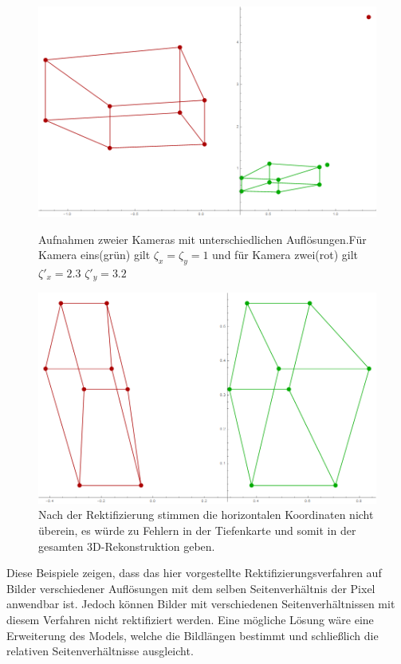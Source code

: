 \begin{figure}[!htb]
	\includegraphics[width=\linewidth]{images/Rectification_Resolution_Abbild_verhaeltnisse.png}
	\caption[Rektifizierung mit $\zeta'_x = 2.3$ und $\zeta'_y = 3.2$]{Aufnahmen zweier Kameras mit unterschiedlichen Auflösungen.Für Kamera eins(grün) gilt \ensuremath{\zeta_x = \zeta_y = 1}  und für Kamera zwei(rot) gilt \ensuremath{\zeta'_x = 2.3} $\zeta'_y= 3.2$}
	\label{fig:7.18}
	\endminipage\hfill
	\includegraphics[width=\linewidth]{images/Rectification_Resolution_verhaeltnisse.png}
	\caption[Rektifizierung mit $\zeta'_x = 2.3$ und $\zeta'_y = 3.2$]{Nach der Rektifizierung stimmen die horizontalen Koordinaten nicht überein, es würde zu Fehlern in der Tiefenkarte und somit in der gesamten 3D-Rekonstruktion geben.}
	\label{fig:7.19}
	\endminipage\hfill
\end{figure}


Diese Beispiele zeigen, dass das hier vorgestellte Rektifizierungsverfahren auf Bilder verschiedener Auflösungen mit dem selben Seitenverhältnis der Pixel anwendbar ist. Jedoch können Bilder mit verschiedenen Seitenverhältnissen mit diesem Verfahren nicht rektifiziert werden. Eine mögliche Lösung wäre eine Erweiterung des Models, welche die Bildlängen bestimmt und schließlich die relativen Seitenverhältnisse ausgleicht.  


